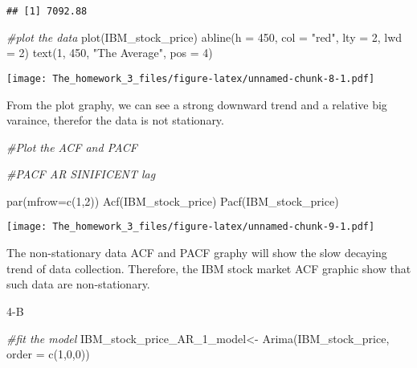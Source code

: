 \documentclass[
]{article}
\newenvironment{Shaded}{\begin{snugshade}}{\end{snugshade}}
\newcommand{\AttributeTok}[1]{\textcolor[rgb]{0.77,0.63,0.00}{#1}}
\newcommand{\CommentTok}[1]{\textcolor[rgb]{0.56,0.35,0.01}{\textit{#1}}}
\newcommand{\DecValTok}[1]{\textcolor[rgb]{0.00,0.00,0.81}{#1}}
\newcommand{\FunctionTok}[1]{\textcolor[rgb]{0.00,0.00,0.00}{#1}}
\newcommand{\NormalTok}[1]{#1}
\newcommand{\OtherTok}[1]{\textcolor[rgb]{0.56,0.35,0.01}{#1}}
\newcommand{\StringTok}[1]{\textcolor[rgb]{0.31,0.60,0.02}{#1}}
\begin{document}
\begin{verbatim}
## [1] 7092.88
\end{verbatim}

\begin{Shaded}
\begin{Highlighting}[]
\CommentTok{\#plot the data}
\FunctionTok{plot}\NormalTok{(IBM\_stock\_price)}
\FunctionTok{abline}\NormalTok{(}\AttributeTok{h =} \DecValTok{450}\NormalTok{, }\AttributeTok{col =} \StringTok{"red"}\NormalTok{, }\AttributeTok{lty =} \DecValTok{2}\NormalTok{, }\AttributeTok{lwd =} \DecValTok{2}\NormalTok{)}
\FunctionTok{text}\NormalTok{(}\DecValTok{1}\NormalTok{, }\DecValTok{450}\NormalTok{, }\StringTok{"The Average"}\NormalTok{, }\AttributeTok{pos =} \DecValTok{4}\NormalTok{)}
\end{Highlighting}
\end{Shaded}

\texttt{[image: The\_homework\_3\_files/figure-latex/unnamed-chunk-8-1.pdf]}

From the plot graphy, we can see a strong downward trend and a relative
big varaince, therefor the data is not stationary.

\begin{Shaded}
\begin{Highlighting}[]
\CommentTok{\#Plot the ACF and PACF}

\CommentTok{\#PACF AR SINIFICENT lag}

\FunctionTok{par}\NormalTok{(}\AttributeTok{mfrow=}\FunctionTok{c}\NormalTok{(}\DecValTok{1}\NormalTok{,}\DecValTok{2}\NormalTok{))}
\FunctionTok{Acf}\NormalTok{(IBM\_stock\_price)}
\FunctionTok{Pacf}\NormalTok{(IBM\_stock\_price)}
\end{Highlighting}
\end{Shaded}

\texttt{[image: The\_homework\_3\_files/figure-latex/unnamed-chunk-9-1.pdf]}

The non-stationary data ACF and PACF graphy will show the slow decaying
trend of data collection. Therefore, the IBM stock market ACF graphic
show that such data are non-stationary.

4-B

\begin{Shaded}
\begin{Highlighting}[]
\CommentTok{\#fit the model}
\NormalTok{IBM\_stock\_price\_AR\_1\_model}\OtherTok{\textless{}{-}} \FunctionTok{Arima}\NormalTok{(IBM\_stock\_price, }\AttributeTok{order =} \FunctionTok{c}\NormalTok{(}\DecValTok{1}\NormalTok{,}\DecValTok{0}\NormalTok{,}\DecValTok{0}\NormalTok{))}
\end{Highlighting}
\end{Shaded}
\end{document}
